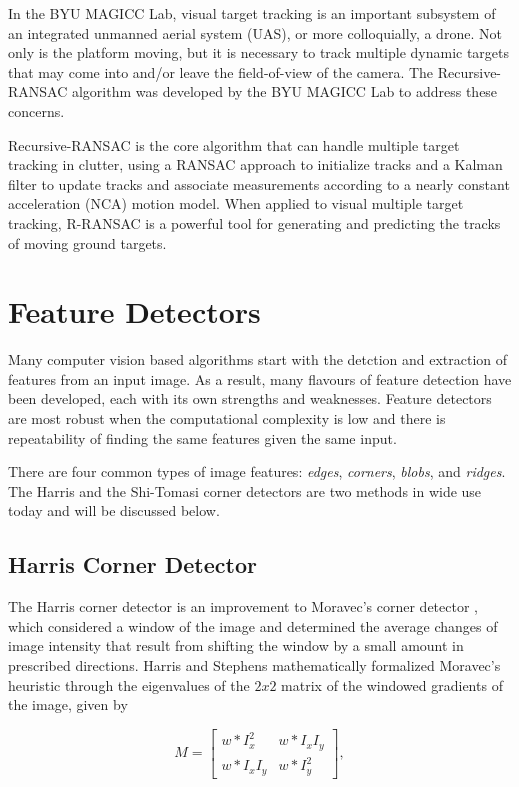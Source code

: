 \documentclass[hidelinks]{article}
\begin{document}
In the BYU MAGICC Lab, visual target tracking is an important subsystem of an integrated unmanned aerial system (UAS), or more colloquially, a drone. Not only is the platform moving, but it is necessary to track multiple dynamic targets that may come into and/or leave the field-of-view of the camera. The Recursive-RANSAC \cite{Niedfeldt2014, Defranco2015} algorithm was developed by the BYU MAGICC Lab to address these concerns.

Recursive-RANSAC is the core algorithm that can handle multiple target tracking in clutter, using a RANSAC approach to initialize tracks and a Kalman filter to update tracks and associate measurements according to a nearly constant acceleration (NCA) motion model. When applied to visual multiple target tracking, R-RANSAC is a powerful tool for generating and predicting the tracks of moving ground targets.


\section{Feature Detectors}
Many computer vision based algorithms start with the detction and extraction of features from an input image. As a result, many flavours of feature detection have been developed, each with its own strengths and weaknesses. Feature detectors are most robust when the computational complexity is low and there is repeatability of finding the same features given the same input.

There are four common types of image features: \textit{edges}, \textit{corners}, \textit{blobs}, and \textit{ridges}. The Harris and the Shi-Tomasi corner detectors are two methods in wide use today and will be discussed below.

\subsection{Harris Corner Detector}
The Harris corner detector \cite{Harris1988} is an improvement to Moravec's corner detector \cite{Moravec1980}, which considered a window of the image and determined the average changes of image intensity that result from shifting the window by a small amount in prescribed directions. Harris and Stephens mathematically formalized Moravec's heuristic through the eigenvalues of the $2x2$ matrix of the windowed gradients of the image, given by

\begin{equation}
M =
\begin{bmatrix}
  w*I_x^2 & w*I_x I_y \\
  w*I_x I_y & w*I_y^2
\end{bmatrix},
\end{equation}
\end{document}
